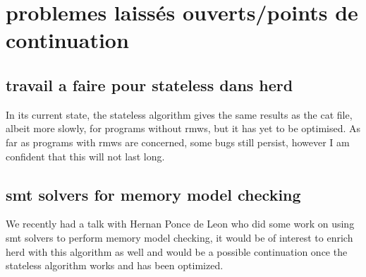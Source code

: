 \documentclass[a4]{article}
\begin{document}
\section{problemes laissés ouverts/points de continuation}

\subsection{travail a faire pour stateless dans herd}

In its current state, the stateless algorithm gives the same results as the cat file, albeit more slowly, for programs without rmws, but it has yet to be optimised. As far as programs with rmws are concerned, some bugs still persist, however I am confident that this will not last long.

\subsection{smt solvers for memory model checking}

We recently had a talk with Hernan Ponce de Leon who did some work on using smt solvers to perform memory model checking, it would be of interest to enrich herd with this algorithm as well and would be a possible continuation once the stateless algorithm works and has been optimized.
\end{document}
